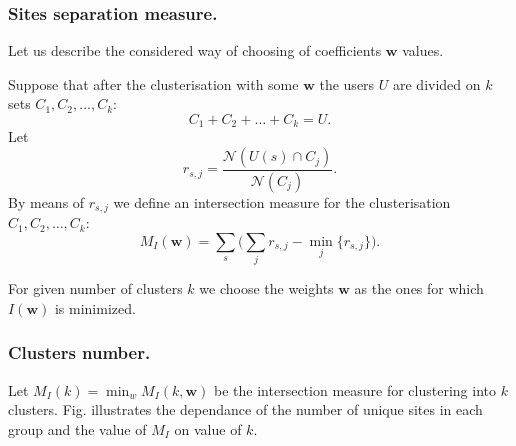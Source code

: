 \documentclass[runningheads,a4paper]{llncs}
\begin{document}
\subsubsection{Sites separation measure.}

Let us describe the considered way of choosing of coefficients $\boldsymbol{w}$ values.

Suppose that after the clusterisation with some $\boldsymbol{w}$ the users $U$ are divided on $k$ sets $C_1, C_2, \dots, C_k$:
\[
	C_1 + C_2 + \dots + C_k = U.
\]
Let
\[
	r_{s,j} = \frac{\mathcal{N}(U(s) \cap C_j)}{\mathcal{N}(C_j)}.
\]
By means of $r_{s,j}$ we define an intersection measure for the clusterisation $C_1, C_2, \dots, C_k$:
\[
	M_I(\boldsymbol{w}) = \sum_s \Big( \sum_j r_{s,j} - \min_j \{r_{s,j}\} \Big).
\]

For given number of clusters $k$ we choose the weights $\boldsymbol{w}$ as the ones for which $I(\boldsymbol{w})$ is minimized.



\subsubsection{Clusters number.}

Let $M_I(k) = \min_w M_I(k, \boldsymbol{w})$ be the intersection measure for clustering into $k$ clusters. Fig. illustrates the dependance of the number of unique sites in each group and the value of $M_I$ on value of $k$.
\end{document}
